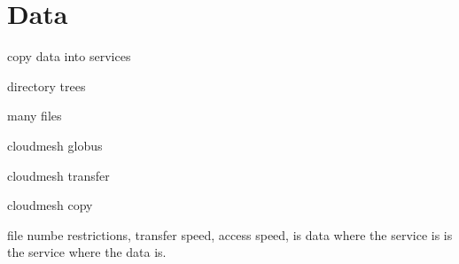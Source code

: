 \section{Data}
\label{sec:data}

copy data into services

directory trees

many files

cloudmesh globus

cloudmesh transfer

cloudmesh copy

file numbe restrictions, transfer speed, access speed, is data where the service is is the service where the data is.




